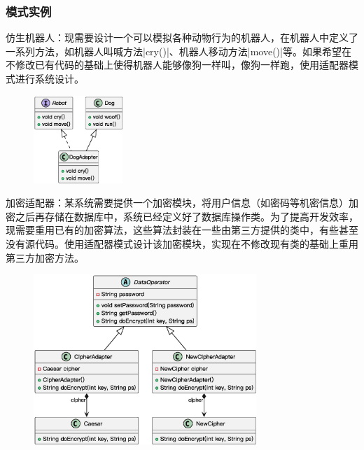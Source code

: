 \subsubsection{模式实例}
仿生机器人：现需要设计一个可以模拟各种动物行为的机器人，在机器人中定义了一系列方法，如机器人叫喊方法\sverb|cry()|、机器人移动方法\sverb|move()|\;等。如果希望在不修改已有代码的基础上使得机器人能够像狗一样叫，像狗一样跑，使用适配器模式进行系统设计。
\begin{figure}[H]
    \vspace{-0.5em}
	\centering
	\includegraphics[width=0.3\textwidth]{images/适配器模式实例1.eps}
    \vspace{-1em}
\end{figure}

加密适配器：某系统需要提供一个加密模块，将用户信息（如密码等机密信息）加密之后再存储在数据库中，系统已经定义好了数据库操作类。为了提高开发效率，现需要重用已有的加密算法，这些算法封装在一些由第三方提供的类中，有些甚至没有源代码。使用适配器模式设计该加密模块，实现在不修改现有类的基础上重用第三方加密方法。
\begin{figure}[H]
    \vspace{-0.5em}
	\centering
	\includegraphics[width=0.75\textwidth]{images/适配器模式实例2.eps}
    \vspace{-1em}
\end{figure}

